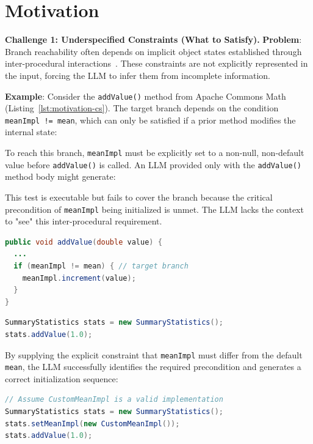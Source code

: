 \section{Motivation}
\textbf{Challenge 1: Underspecified Constraints (What to Satisfy).}
\textbf{Problem}: Branch reachability often depends on implicit object states established through inter-procedural interactions~\cite{baldoni2018}. These constraints are not explicitly represented in the input, forcing the LLM to infer them from incomplete information.

\textbf{Example}: Consider the \texttt{addValue()} method from Apache Commons Math (Listing~\ref{lst:motivation-cs}). The target branch depends on the condition \texttt{meanImpl != mean}, which can only be satisfied if a prior method modifies the internal state:

To reach this branch, \texttt{meanImpl} must be explicitly set to a non-null, non-default value before \texttt{addValue()} is called. An LLM provided only with the \texttt{addValue()} method body might generate:

This test is executable but fails to cover the branch because the critical precondition of \texttt{meanImpl} being initialized is unmet. The LLM lacks the context to "see" this inter-procedural requirement.

\begin{lstlisting}[language=Java, label={lst:motivation-cs}, caption={Target branch with hidden cross-method dependency}]
public void addValue(double value) {
  ...
  if (meanImpl != mean) { // target branch
    meanImpl.increment(value);
  }
}
\end{lstlisting}

\begin{lstlisting}[language=Java, caption={LLM-generated test (constraint not satisfied)}]
SummaryStatistics stats = new SummaryStatistics();
stats.addValue(1.0);
\end{lstlisting}


By supplying the explicit constraint that \texttt{meanImpl} must differ from the default \texttt{mean}, the LLM successfully identifies the required precondition and generates a correct initialization sequence:

\begin{lstlisting}[language=Java, caption={Correct test (constraint satisfied)}]
// Assume CustomMeanImpl is a valid implementation
SummaryStatistics stats = new SummaryStatistics();
stats.setMeanImpl(new CustomMeanImpl());
stats.addValue(1.0);
\end{lstlisting}

